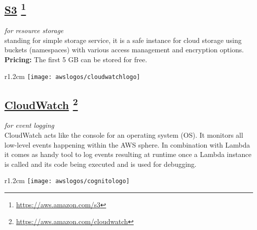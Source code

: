 %

\subsection*{
\href{https://aws.amazon.com/s3/}{\textbf{S3}} \footnote{\url{https://aws.amazon.com/s3}}
}
\textit{for resource storage}\\
standing for simple storage service, it is a safe instance for cloud storage using buckets (namespaces) with various access management and encryption options. \\ \textbf{Pricing:} The first 5 GB can be stored for free.



\begin{wrapfigure}[2]{r}{1.2cm}
	\texttt{[image: awslogos/cloudwatchlogo]}
\end{wrapfigure}

%

	
	\subsection*{
		\href{https://aws.amazon.com/iam/}{\textbf{CloudWatch}} \footnote{\url{https://aws.amazon.com/cloudwatch}}
	}
	\textit{for event logging}\\
	CloudWatch acts like the console for an operating system (OS). It monitors all low-level events happening within the AWS sphere. In combination with Lambda it comes as handy tool to log events resulting at runtime once a Lambda instance is called and its code being executed and is used for debugging.
	
	
\begin{wrapfigure}[2]{r}{1.2cm}
	\texttt{[image: awslogos/cognitologo]}
\end{wrapfigure}


